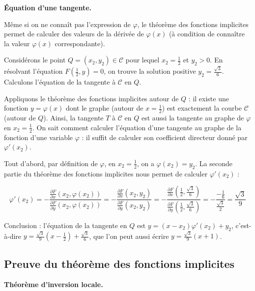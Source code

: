 \documentclass[11pt, class=report,crop=false]{standalone}
\begin{document}
\textbf{\'Equation d'une tangente.}
  
Même si on ne connaît pas l'expression de $\varphi$, le théorème des fonctions implicites permet de calculer des valeurs de la dérivée de $\varphi(x)$ (à condition de connaître la valeur $\varphi(x)$ correspondante).

Considérons le point $Q=(x_2,y_2) \in \mathcal{C}$ pour lequel $x_2 = \frac12$ et $y_2>0$.
En résolvant l'équation $F(\frac12,y)=0$, on trouve la solution positive $y_2 = \frac{\sqrt3}{6}$. Calculons l'équation de la tangente à $\mathcal{C}$ en $Q$.
   
   
Appliquons le théorème des fonctions implicites autour de $Q$ : il existe une fonction $y = \varphi(x)$ dont le graphe (autour de $x=\frac12$) est exactement la courbe $\mathcal{C}$ (autour de $Q$).
Ainsi, la tangente $T$ à $\mathcal{C}$ en $Q$ est aussi la tangente au graphe de $\varphi$ en $x_2=\frac12$. 
On sait comment calculer l'équation d'une tangente au graphe de la fonction d'une variable $\varphi$ : il suffit de calculer son coefficient directeur donné par
$\varphi'(x_2)$.

Tout d'abord, par définition de $\varphi$, en $x_2=\frac12$, on a $\varphi(x_2)=y_2$.
La seconde partie du théorème des fonctions implicites nous permet de calculer $\varphi'(x_2)$ :

$$
	\varphi'(x_2) 
	=    -\frac{\frac{\partial F}{\partial x}(x_2, \varphi(x_2))}{\frac{\partial F}{\partial y}(x_2, \varphi(x_2))} 
	= -\frac{\frac{\partial F}{\partial x}(x_2, y_2)}{\frac{\partial F}{\partial y}(x_2, y_2)} 
	= -\frac{\frac{\partial F}{\partial x}( \frac12,\frac{\sqrt3}{6} )}{\frac{\partial F}{\partial y}( \frac12,\frac{\sqrt3}{6}) }   
	= - \frac{-\frac16}{\frac{\sqrt3}{2}} 
	= \frac{\sqrt3}{9} 
$$

Conclusion : l'équation de la tangente en $Q$ est $y=(x-x_2)\varphi'(x_2)+ y_2$, c'est-à-dire
$y= \frac{\sqrt3}{9}(x-\frac12) + \frac{\sqrt3}{6}$,
que l'on peut aussi écrire $y=\frac{\sqrt3}{9}(x+1)$.

\subsection{Preuve du théorème des fonctions implicites}

\textbf{Théorème d'inversion locale.}
\end{document}
